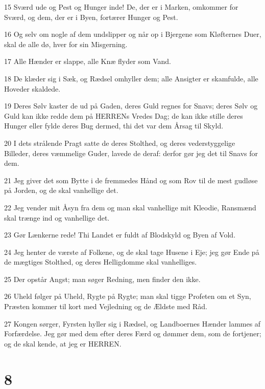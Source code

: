 \par 15 Sværd ude og Pest og Hunger inde! De, der er i Marken, omkommer for Sværd, og dem, der er i Byen, fortærer Hunger og Pest.
\par 16 Og selv om nogle af dem undslipper og når op i Bjergene som Kløfternes Duer, skal de alle dø, hver for sin Misgerning.
\par 17 Alle Hænder er slappe, alle Knæ flyder som Vand.
\par 18 De klæder sig i Sæk, og Rædsel omhyller dem; alle Ansigter er skamfulde, alle Hoveder skaldede.
\par 19 Deres Sølv kaster de ud på Gaden, deres Guld regnes for Snavs; deres Sølv og Guld kan ikke redde dem på HERRENs Vredes Dag; de kan ikke stille deres Hunger eller fylde deres Bug dermed, thi det var dem Årsag til Skyld.
\par 20 I dets strålende Pragt satte de deres Stolthed, og deres vederstyggelige Billeder, deres væmmelige Guder, lavede de deraf: derfor gør jeg det til Snavs for dem.
\par 21 Jeg giver det som Bytte i de fremmedes Hånd og som Rov til de mest gudløse på Jorden, og de skal vanhellige det.
\par 22 Jeg vender mit Åsyn fra dem og man skal vanhellige mit Kleodie, Ransmænd skal trænge ind og vanhellige det.
\par 23 Gør Lænkerne rede! Thi Landet er fuldt af Blodskyld og Byen af Vold.
\par 24 Jeg henter de værste af Folkene, og de skal tage Husene i Eje; jeg gør Ende på de mægtiges Stolthed, og deres Helligdomme skal vanhelliges.
\par 25 Der opstår Angst; man søger Redning, men finder den ikke.
\par 26 Uheld følger på Uheld, Rygte på Rygte; man skal tigge Profeten om et Syn, Præsten kommer til kort med Vejledning og de Ældste med Råd.
\par 27 Kongen sørger, Fyrsten hyller sig i Rædsel, og Landboernes Hænder lammes af Forfærdelse. Jeg gør med dem efter deres Færd og dømmer dem, som de fortjener; og de skal kende, at jeg er HERREN.

\chapter{8}

